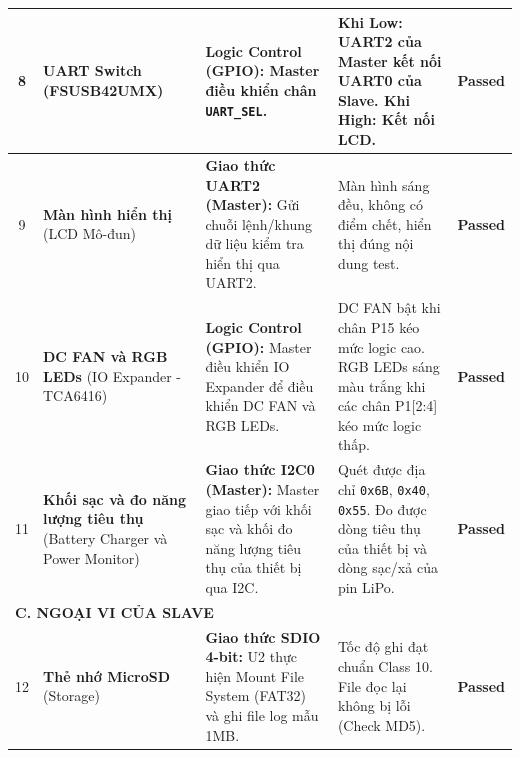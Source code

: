 \begin{longtable}{|c|p{3.5cm}|p{5cm}|p{3.5cm}|c|}
            8 & \textbf{UART Switch} \newline (FSUSB42UMX) & \textbf{Logic Control (GPIO):} \newline Master điều khiển chân \texttt{UART\_SEL}. & Khi Low: UART2 của Master kết nối UART0 của Slave. Khi High: Kết nối LCD. & \textcolor{modern_blue}{\textbf{Passed}} \\ \hline

            9 & \textbf{Màn hình hiển thị} \newline (LCD Mô-đun) & \textbf{Giao thức UART2 (Master):} \newline Gửi chuỗi lệnh/khung dữ liệu kiểm tra hiển thị qua UART2. & Màn hình sáng đều, không có điểm chết, hiển thị đúng nội dung test. & \textcolor{modern_blue}{\textbf{Passed}} \\ \hline

            10 & \textbf{DC FAN và RGB LEDs} \newline (IO Expander - TCA6416) & \textbf{Logic Control (GPIO):} \newline Master điều khiển IO Expander để điều khiển DC FAN và RGB LEDs. & DC FAN bật khi chân P15 kéo mức logic cao. RGB LEDs sáng màu trắng khi các chân P1[2:4] kéo mức logic thấp. & \textcolor{modern_blue}{\textbf{Passed}} \\ \hline

            11 & \textbf{Khối sạc và đo năng lượng tiêu thụ} \newline (Battery Charger và Power Monitor) & \textbf{Giao thức I2C0 (Master):} \newline Master giao tiếp với khối sạc và khối đo năng lượng tiêu thụ của thiết bị qua I2C. & Quét được địa chỉ \texttt{0x6B}, \texttt{0x40}, \texttt{0x55}. Đo được dòng tiêu thụ của thiết bị và dòng sạc/xả của pin LiPo. & \textcolor{modern_blue}{\textbf{Passed}} \\ \hline

            \multicolumn{5}{|l|}{\textbf{C. NGOẠI VI CỦA SLAVE}} \\ \hline

            12 & \textbf{Thẻ nhớ MicroSD} \newline (Storage) & \textbf{Giao thức SDIO 4-bit:} \newline U2 thực hiện Mount File System (FAT32) và ghi file log mẫu 1MB. & Tốc độ ghi đạt chuẩn Class 10. File đọc lại không bị lỗi (Check MD5). & \textcolor{modern_blue}{\textbf{Passed}} \\ \hline


\end{longtable}
